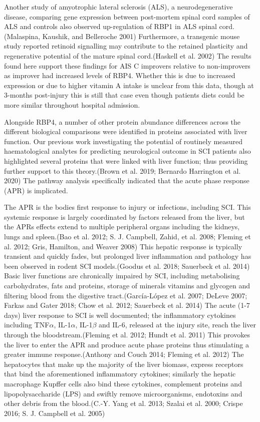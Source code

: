 \documentclass[9pt,lineno]{elife}
\begin{document}
\begin{landscape}
\begin{landscape}
Another study of amyotrophic lateral sclerosis (ALS), a neurodegenerative disease, comparing gene expression between post-mortem spinal cord samples of ALS and controls also observed up-regulation of RBP1 in ALS spinal cord.(Malaspina, Kaushik, and Belleroche 2001) Furthermore, a transgenic mouse study reported retinoid signalling may contribute to the retained plasticity and regenerative potential of the mature spinal cord.(Haskell et al. 2002) The results found here support these findings for AIS C improvers relative to non-improvers as improver had increased levels of RBP4.
Whether this is due to increased expression or due to higher vitamin A intake is unclear from this data, though at 3-months post-injury this is still that case even though patients diets could be more similar throughout hospital admission.

Alongside RBP4, a number of other protein abundance differences across the different biological comparisons were identified in proteins associated with liver function.
Our previous work investigating the potential of routinely measured haematological analytes for predicting neurological outcome in SCI patients also highlighted several proteins that were linked with liver function; thus providing further support to this theory.(Brown et al. 2019; Bernardo Harrington et al. 2020) The pathway analysis specifically indicated that the acute phase response (APR) is implicated.

The APR is the bodies first response to injury or infections, including SCI.
This systemic response is largely coordinated by factors released from the liver, but the APRs effects extend to multiple peripheral organs including the kidneys, lungs and spleen.(Bao et al. 2012; S. J. Campbell, Zahid, et al. 2008; Fleming et al. 2012; Gris, Hamilton, and Weaver 2008) This hepatic response is typically transient and quickly fades, but prolonged liver inflammation and pathology has been observed in rodent SCI models.(Goodus et al. 2018; Sauerbeck et al. 2014) Basic liver functions are chronically impaired by SCI, including metabolising carbohydrates, fats and proteins, storage of minerals vitamins and glycogen and filtering blood from the digestive tract.(García-López et al. 2007; DeLeve 2007; Farkas and Gater 2018; Chow et al. 2012; Sauerbeck et al. 2014) The acute (1-7 days) liver response to SCI is well documented; the inflammatory cytokines including TNF\(\alpha\), IL-1\(\alpha\), IL-1\(\beta\) and IL-6, released at the injury site, reach the liver through the bloodstream.(Fleming et al. 2012; Hundt et al. 2011) This provokes the liver to enter the APR and produce acute phase proteins thus stimulating a greater immune response.(Anthony and Couch 2014; Fleming et al. 2012) The hepatocytes that make up the majority of the liver biomass, express receptors that bind the aforementioned inflammatory cytokines; similarly the hepatic macrophage Kupffer cells also bind these cytokines, complement proteins and lipopolysaccharide (LPS) and swiftly remove microorganisms, endotoxins and other debris from the blood.(C.-Y. Yang et al. 2013; Szalai et al. 2000; Crispe 2016; S. J. Campbell et al. 2005)


\end{landscape}
\end{landscape}
\end{document}
